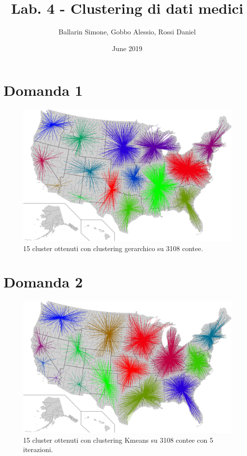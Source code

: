 \documentclass{article}
\title{Lab. 4 - Clustering di dati medici}
\author{Ballarin Simone, Gobbo Alessio, Rossi Daniel}
\date{June 2019}
\begin{document}
\maketitle

\section*{Domanda 1}
\begin{center}
	\begin{figure}[H]
		\hspace*{1.5cm}\includegraphics[width=0.8\linewidth, valign=t]{figures/Domanda1}
		\caption*{15 cluster ottenuti con clustering gerarchico su 3108 contee.}
	\end{figure}
\end{center}

\section*{Domanda 2}
\begin{center}
	\begin{figure}[H]
		\hspace*{1.5cm}\includegraphics[width=0.8\linewidth, valign=t]{figures/Domanda2}
		\caption*{15 cluster ottenuti con clustering Kmeans su 3108 contee con 5 iterazioni.}
										
	\end{figure}
\end{center}
\end{document}
